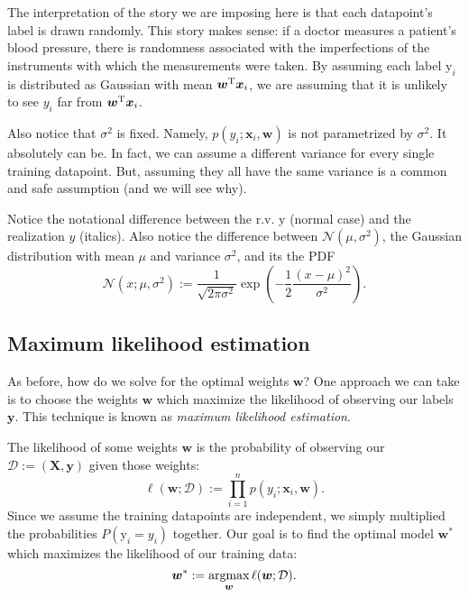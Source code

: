 The interpretation of the story we are imposing here is that each datapoint's label is drawn randomly. This story makes sense: if a doctor measures a patient's blood pressure, there is randomness associated with the imperfections of the instruments with which the measurements were taken. By assuming each label $\mathrm y_i$ is distributed as Gaussian with mean $\bm w^{\mathrm T} \bm x_i$, we are assuming that it is unlikely to see $y_i$ far from $\bm w^{\mathrm T} \bm x_i$.

Also notice that $\sigma^2$ is fixed. Namely, $p(y_i; \bm x_i, \bm w)$ is not parametrized by $\sigma^2$. It absolutely can be. In fact, we can assume a different variance for every single training datapoint. But, assuming they all have the same variance is a common and safe assumption (and we will see why).

\begin{warning}
    Notice the notational difference between the r.v. $\mathrm y$ (normal case) and the realization $y$ (italics). Also notice the difference between $\mathcal{N}(\mu, \sigma^2)$, the Gaussian distribution with mean $\mu$ and variance $\sigma^2$, and its the PDF $$\mathcal{N}(x; \mu, \sigma^2) := \frac{1}{\sqrt{2 \pi \sigma^2}} \exp\left( -\frac12 \frac{(x-\mu)^2}{\sigma^2} \right).$$
\end{warning}

\subsection{Maximum likelihood estimation}

As before, how do we solve for the optimal weights $\bm w$? One approach we can take is to choose the weights $\bm w$ which maximize the likelihood of observing our labels $\bm y$. This technique is known as \textit{maximum likelihood estimation}.

The likelihood of some weights $\bm{w}$ is the probability of observing our $\mathcal D := (\bm{X}, \bm{y})$ given those weights: $$\ell(\bm{w}; \mathcal D) := \prod_{i=1}^n p(y_i; \bm{x}_i, \bm{w}).$$ Since we assume the training datapoints are independent, we simply multiplied the probabilities $P(\mathrm y_i = y_i)$ together. Our goal is to find the optimal model $\bm{w}^*$ which maximizes the likelihood of our training data: $$\bm{w}^* := \operatorname*{argmax}_{\bm{w}} \ell(\bm{w}; \mathcal D).$$

